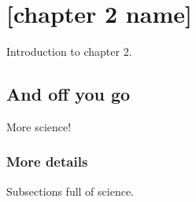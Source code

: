 \chapter{[chapter 2 name]} \label{ch:[chapter 2 label]}

Introduction to chapter 2.


\section{And off you go}

More science!


\subsection{More details}

Subsections full of science.